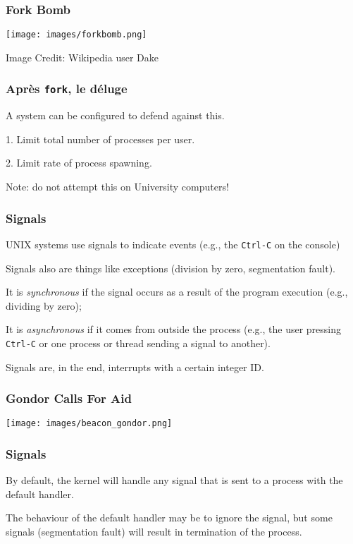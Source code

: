 \begin{frame}
	\frametitle{Fork Bomb}

	\begin{center}
		\texttt{[image: images/forkbomb.png]}
	\end{center}
	\hfill Image Credit: Wikipedia user Dake

\end{frame}


\begin{frame}
	\frametitle{Apr\`{e}s \texttt{fork}, le d\'{e}luge}
	A system can be configured to defend against this.

	1. Limit total number of processes per user.

	2. Limit rate of process spawning.

	Note: do not attempt this on University computers!

\end{frame}


\begin{frame}
	\frametitle{Signals}

	UNIX systems use signals to indicate events (e.g., the \texttt{Ctrl-C} on the console)

	Signals also are things like exceptions (division by zero, segmentation fault).

	It is \textit{synchronous} if the signal occurs as a result of the program execution (e.g., dividing by zero);

	It is \textit{asynchronous} if it comes from outside the process (e.g., the user pressing \texttt{Ctrl-C} or one process or thread sending a signal to another).

	Signals are, in the end, interrupts with a certain integer ID.


\end{frame}


\begin{frame}
	\frametitle{Gondor Calls For Aid}

	\begin{center}
		\texttt{[image: images/beacon\_gondor.png]}
	\end{center}

\end{frame}



\begin{frame}
	\frametitle{Signals}

	By default, the kernel will handle any signal that is sent to a process with the default handler.

	The behaviour of the default handler may be to ignore the signal, but some signals (segmentation fault) will result in termination of the process.


\end{frame}


